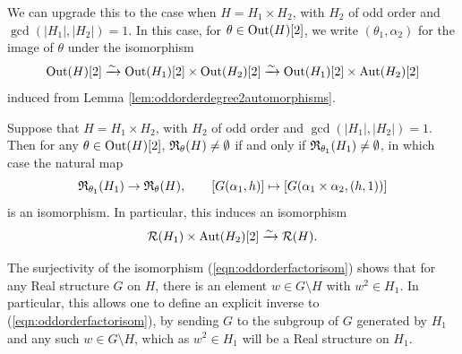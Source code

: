 We can upgrade this to the case when $H = H_1 \times H_2$, with $H_2$ of odd order and $\gcd(|H_1|,|H_2|) = 1$. In this case, for $\theta \in \operatorname{Out}(H)[2]$, we write $(\theta_1, \alpha_2)$ for the image of $\theta$ under the isomorphism
\[
\operatorname{Out}(H)[2] \xrightarrow{\sim} \operatorname{Out}(H_1)[2] \times \operatorname{Out}(H_2)[2] \xrightarrow{\sim} \operatorname{Out}(H_1)[2] \times \operatorname{Aut}(H_2)[2]
\]
induced from Lemma \ref{lem:oddorderdegree2automorphisms}.
\begin{cor}\label{cor:Realstructuresoddorderfactor}
  Suppose that $H = H_1 \times H_2$, with $H_2$ of odd order and $\gcd(|H_1|,|H_2|) = 1$. Then for any $\theta \in \operatorname{Out}(H)[2]$, ${\mathfrak R}_{\theta}(H) \neq \emptyset$ if and only if ${\mathfrak R}_{\theta_1}(H_1) \neq \emptyset$, in which case the natural map
  \begin{equation}\label{eqn:oddorderfactorisom}
  {\mathfrak R}_{\theta_1}(H_1) \rightarrow {\mathfrak R}_{\theta}(H), \qquad [G(\alpha_1, h)] \mapsto [G(\alpha_1 \times \alpha_2, (h,1))]
  \end{equation}
  is an isomorphism. In particular, this induces an isomorphism
  \[
    {\mathcal R}(H_1) \times \operatorname{Aut}(H_2)[2] \xrightarrow{\sim} {\mathcal R}(H).
  \]
\end{cor}

\begin{remark}
  The surjectivity of the isomorphism (\ref{eqn:oddorderfactorisom}) shows that for any Real structure $G$ on $H$, there is an element $w \in G \setminus H$ with $w^2 \in H_1$. In particular, this allows one to define an explicit inverse to (\ref{eqn:oddorderfactorisom}), by sending $G$ to the subgroup of $G$ generated by $H_1$ and any such $w \in G \setminus H$, which as $w^2 \in H_1$ will be a Real structure on $H_1$.
\end{remark}

